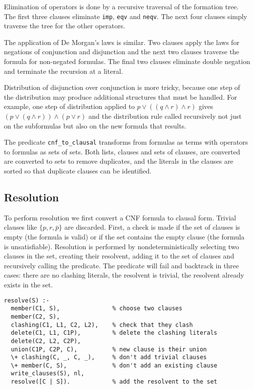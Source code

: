 \documentclass[11pt]{article}
\newcommand*{\p}[1]{\textup{\texttt{#1}}}
\begin{document}
Elimination of operators is done by a recursive traversal of the
formation tree. The first three clauses eliminate \p{imp}, \p{eqv} and
\p{neqv}. The next four clauses simply traverse the tree for the other
operators.

The application of De Morgan's laws is similar. Two clauses apply the
laws for negations of conjunction and disjunction and the next two
clauses traverse the formula for non-negated formulas. The final two
clauses eliminate double negation and terminate the recursion at a
literal.

Distribution of disjunction over conjunction is more tricky, because one
step of the distribution may produce additional structures that must be
handled. For example, one step of distribution applied to $p \vee
((q\wedge r) \wedge r)$ gives $(p \vee (q\wedge r)) \wedge (p \vee r)$
and the distribution rule called recursively not just on the subformulas
but also on the new formula that results.

The predicate \p{cnf\_to\_clausal} transforms from formulas as terms
with operators to formulas as sets of sets. Both lists, clauses and
sets of clauses, are converted are converted to sets to remove
duplicates, and the literals in the clauses are sorted so that duplicate
clauses can be identified.




\subsection{Resolution}\label{s.resprop}

To perform resolution we first convert a CNF formula to clausal form.
Trivial clauses like $\{p,r,\bar{p}\}$ are discarded. First, a check is
made if the set of clauses is empty (the formula is valid) or if the set
contains the empty clause (the formula is unsatisfiable). Resolution is
performed by nondeterministically selecting two clauses in the set,
creating their resolvent, adding it to the set of clauses and
recursively calling the predicate. The predicate will fail and backtrack
in three cases: there are no clashing literals, the resolvent is
trivial, the resolvent already exists in the set.

\begin{verbatim}
resolve(S) :-
  member(C1, S),               % choose two clauses
  member(C2, S),               
  clashing(C1, L1, C2, L2),    % check that they clash
  delete(C1, L1, C1P),         % delete the clashing literals
  delete(C2, L2, C2P),         
  union(C1P, C2P, C),          % new clause is their union
  \+ clashing(C, _, C, _),     % don't add trivial clauses
  \+ member(C, S),             % don't add an existing clause
  write_clauses(S), nl,        
  resolve([C | S]).            % add the resolvent to the set
\end{verbatim}
\end{document}
